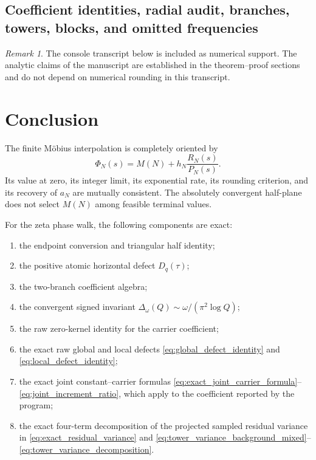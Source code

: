 \documentclass[11pt]{amsart}
\numberwithin{equation}{section}
\theoremstyle{plain}
\theoremstyle{definition}
\theoremstyle{remark}
\newtheorem{remark}[theorem]{Remark}
\newcommand{\1}{\mathbf{1}}
\begin{document}
\subsection{Coefficient identities, radial audit, branches, towers, blocks,
and omitted frequencies}
\label{subsec:numerical_complete_output_tables}

\begin{remark}
\label{rem:complete_output_scope}
The console transcript below is included as numerical support.  The analytic
claims of the manuscript are established in the theorem--proof sections and
do not depend on numerical rounding in this transcript.
\end{remark}



\section{Conclusion}
\label{sec:conclusion}

The finite Möbius interpolation is completely oriented by
\begin{equation}
\Phi_N(s)
=
M(N)+h_N\frac{R_N(s)}{P_N(s)}.
\label{eq:conclusion_Phi}
\end{equation}
Its value at zero, its integer limit, its exponential rate, its rounding
criterion, and its recovery of \(a_N\) are mutually consistent.  The
absolutely convergent half-plane does not select \(M(N)\) among feasible
terminal values.

For the zeta phase walk, the following components are exact:

\begin{enumerate}[label=\textup{(\roman*)}]
\item the endpoint conversion and triangular half identity;
\item the positive atomic horizontal defect \(D_q(\tau)\);
\item the two-branch coefficient algebra;
\item the convergent signed invariant
\(\Delta_\omega(Q)\sim\omega/(\pi^2\log Q)\);
\item the raw zero-kernel identity for the carrier coefficient;
\item the exact raw global and local defects
\eqref{eq:global_defect_identity} and
\eqref{eq:local_defect_identity};
\item the exact joint constant--carrier formulas
\eqref{eq:exact_joint_carrier_formula}--\eqref{eq:joint_increment_ratio},
which apply to the coefficient reported by the program;
\item the exact four-term decomposition of the projected sampled
residual variance in \eqref{eq:exact_residual_variance} and
\eqref{eq:tower_variance_background_mixed}--
\eqref{eq:tower_variance_decomposition}.
\end{enumerate}
\end{document}
